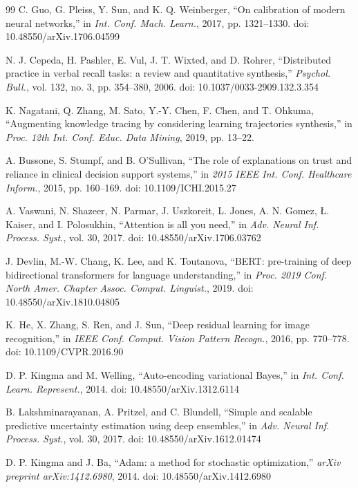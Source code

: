 \documentclass[preprint,12pt]{elsarticle}
\begin{document}
\begin{thebibliography}{99}
 C. Guo, G. Pleiss, Y. Sun, and K. Q. Weinberger, ``On calibration of modern neural networks,'' in \textit{Int. Conf. Mach. Learn.}, 2017, pp. 1321--1330. doi: 10.48550/arXiv.1706.04599

 N. J. Cepeda, H. Pashler, E. Vul, J. T. Wixted, and D. Rohrer, ``Distributed practice in verbal recall tasks: a review and quantitative synthesis,'' \textit{Psychol. Bull.}, vol. 132, no. 3, pp. 354--380, 2006. doi: 10.1037/0033-2909.132.3.354

 K. Nagatani, Q. Zhang, M. Sato, Y.-Y. Chen, F. Chen, and T. Ohkuma, ``Augmenting knowledge tracing by considering learning trajectories synthesis,'' in \textit{Proc. 12th Int. Conf. Educ. Data Mining}, 2019, pp. 13--22.

 A. Bussone, S. Stumpf, and B. O'Sullivan, ``The role of explanations on trust and reliance in clinical decision support systems,'' in \textit{2015 IEEE Int. Conf. Healthcare Inform.}, 2015, pp. 160--169. doi: 10.1109/ICHI.2015.27

 A. Vaswani, N. Shazeer, N. Parmar, J. Uszkoreit, L. Jones, A. N. Gomez, Ł. Kaiser, and I. Polosukhin, ``Attention is all you need,'' in \textit{Adv. Neural Inf. Process. Syst.}, vol. 30, 2017. doi: 10.48550/arXiv.1706.03762

 J. Devlin, M.-W. Chang, K. Lee, and K. Toutanova, ``BERT: pre-training of deep bidirectional transformers for language understanding,'' in \textit{Proc. 2019 Conf. North Amer. Chapter Assoc. Comput. Linguist.}, 2019. doi: 10.48550/arXiv.1810.04805

 K. He, X. Zhang, S. Ren, and J. Sun, ``Deep residual learning for image recognition,'' in \textit{IEEE Conf. Comput. Vision Pattern Recogn.}, 2016, pp. 770--778. doi: 10.1109/CVPR.2016.90

 D. P. Kingma and M. Welling, ``Auto-encoding variational Bayes,'' in \textit{Int. Conf. Learn. Represent.}, 2014. doi: 10.48550/arXiv.1312.6114

 B. Lakshminarayanan, A. Pritzel, and C. Blundell, ``Simple and scalable predictive uncertainty estimation using deep ensembles,'' in \textit{Adv. Neural Inf. Process. Syst.}, vol. 30, 2017. doi: 10.48550/arXiv.1612.01474

 D. P. Kingma and J. Ba, ``Adam: a method for stochastic optimization,'' \textit{arXiv preprint arXiv:1412.6980}, 2014. doi: 10.48550/arXiv.1412.6980


\end{thebibliography}
\end{document}
